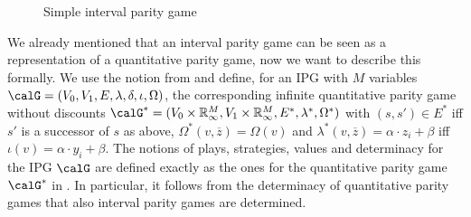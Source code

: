 \documentclass[fleqn,envcountsame]{LMCS}
\newcommand{\Rinf}{\ensuremath{\mathbb{R}_{\infty}}}
\newcommand{\ol}[1]{\ensuremath{\overline{#1}}}
\newcommand{\labels}{\ensuremath{\lambda}}
\newcommand{\coeff}{\ensuremath{\delta}} \newcommand{\indexi}{\ensuremath{\iota}}
\begin{document}
\begin{figure}[h]\label{ipg}
\begin{center}
\end{center}
\caption{Simple interval parity game} 
\end{figure}

We already mentioned that an interval parity game can be seen
as a representation of a quantitative parity game, now we 
want to describe this formally.
We use the notion from \cite{FGK10} and define,
for an IPG with $M$ variables
$\calG = (V_0, V_1, E, \labels, \coeff, \indexi, \Omega)$,
the corresponding infinite quantitative parity game without discounts
$\calG^* = (V_0 \times \Rinf^M, V_1 \times \Rinf^M, E^*, \lambda^*, \Omega^*)$
with $(s, s') \in E^*$ iff $s'$ is a successor of $s$ as above,
$\Omega^*(v, \ol{z}) = \Omega(v)$ and
$\lambda^*(v, \ol{z})=\alpha \cdot z_i + \beta $ iff
$\indexi(v)=\alpha \cdot y_i + \beta$.
The notions of plays, strategies, values and determinacy 
for the IPG $\calG$ are defined exactly as the ones for
the quantitative parity game $\calG^*$ in \cite{FGK10}.
In particular, it follows from the determinacy of
quantitative parity games that also interval parity games
are determined.
\end{document}
